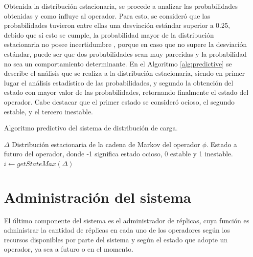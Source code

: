 Obtenida la distribución estacionaria, se procede a analizar las probabilidades obtenidas y como influye al operador. Para esto, se consideró que las probabilidades tuvieron entre ellas una desviación estándar superior a 0.25, debido que si esto se cumple, la probabilidad mayor de la distribución estacionaria no posee incertidumbre \citep{soong2004fundamentals}, porque en caso que no supere la desviación estándar, puede ser que dos probabilidades sean muy parecidas y la probabilidad no sea un comportamiento determinante. En el Algoritmo \ref{alg:predictive} se describe el análisis que se realiza a la distribución estacionaria, siendo en primer lugar el análisis estadístico de las probabilidades, y segundo la obtención del estado con mayor valor de las probabilidades, retornando finalmente el estado del operador. Cabe destacar que el primer estado se consideró ocioso, el segundo estable, y el tercero inestable.

\begin{algorithm}[!ht]
	\caption{Algoritmo predictivo del sistema de distribución de carga.}
	\label{alg:predictive}
	\begin{algorithmic}[1]
	\REQUIRE$\Delta$ Distribución estacionaria de la cadena de Markov del operador $\phi$.
	\ENSURE Estado a futuro del operador, donde -1 significa estado ocioso, 0 estable y 1 inestable.
		\STATE $i \leftarrow getStateMax(\Delta)$ 
		\ELSE
		\ENDIF
	\ENDIF
	
	
	\end{algorithmic}
\end{algorithm}

\section{Administración del sistema}

El último componente del sistema es el administrador de réplicas, cuya función es administrar la cantidad de réplicas en cada uno de los operadores según los recursos disponibles por parte del sistema y según el estado que adopte un operador, ya sea a futuro o en el momento.

